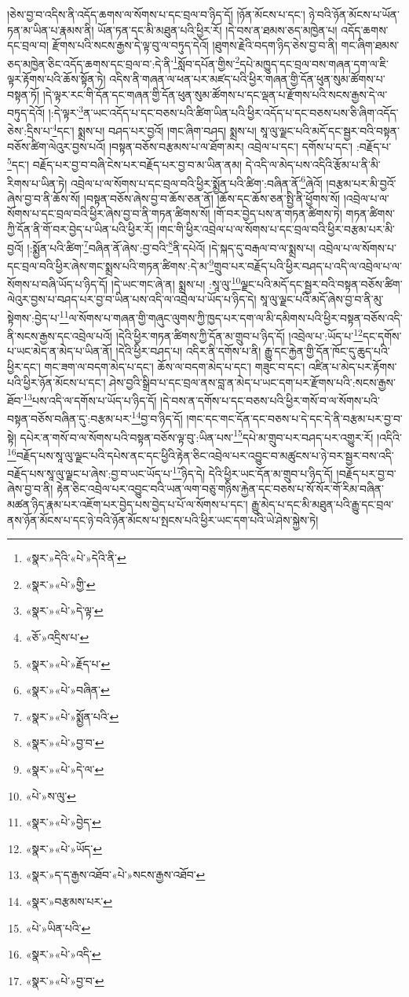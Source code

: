 །ཅེས་བྱ་བ་འདིས་ནི་འདོད་ཆགས་ལ་སོགས་པ་དང་བྲལ་བ་ཉིད་དོ། །ཉོན་མོངས་པ་དང་། ཉེ་བའི་ཉོན་མོངས་པ་ཡོན་ཏན་མ་ཡིན་པ་རྣམས་ནི། ཡོན་ཏན་དང་མི་མཐུན་པའི་ཕྱིར་རོ། །དེ་བས་ན་ཐམས་ཅད་མཁྱེན་པ། འདོད་ཆགས་དང་བྲལ་བ། རྫོགས་པའི་སངས་རྒྱས་དེ་ལྟ་བུ་ལ་བཏུད་དེའོ། །ཐུགས་རྗེའི་བདག་ཉིད་ཅེས་བྱ་བ་ནི། གང་ཞིག་ཐམས་ཅད་མཁྱེན་ཅིང་འདོད་ཆགས་དང་བྲལ་བ་:དེ་ནི་\footnote{«སྣར་»དེའི་«པེ་»དེའི་ནི་}སློབ་དཔོན་གྱིས་\footnote{«སྣར་»«པེ་»གྱི་}དཔེ་མཁྱུད་དང་བྲལ་བས་གཞན་དག་ལ་ཇི་ལྟར་རྟོགས་པའི་ཆོས་སྟོན་ཏེ། འདིས་ནི་གཞན་ལ་ཕན་པར་མཛད་པའི་ཕྱིར་གཞན་གྱི་དོན་ཕུན་སུམ་ཚོགས་པ་བསྟན་ཏོ། །དེ་ལྟར་རང་གི་དོན་དང་གཞན་གྱི་དོན་ཕུན་སུམ་ཚོགས་པ་དང་ལྡན་པ་རྫོགས་པའི་སངས་རྒྱས་དེ་ལ་བཏུད་དེའོ། །:དེ་ལྟར་\footnote{«སྣར་»«པེ་»དེ་ལྟ་}ན་ཡང་འདོད་པ་དང་བཅས་པའི་ཚིག་ཡིན་པའི་ཕྱིར་འདོད་པ་དང་བཅས་པས་ཅི་ཞིག་འདོད་ཅེས་:དྲིས་པ་\footnote{«ཅོ་»འདྲིས་པ་}དང་། སྨྲས་པ། བཤད་པར་བྱའོ། །གང་ཞིག་བཤད། སྨྲས་པ། སཱ་ལུ་ལྗང་པའི་མདོ་དང་སྦྱར་བའི་བསྟན་བཅོས་ཚིག་ལེའུར་བྱས་པའོ། །བསྟན་བཅོས་བརྩམས་པ་ལ་ཐོག་མར། འབྲེལ་པ་དང་། དགོས་པ་དང་། :བརྗོད་པ་\footnote{«སྣར་»«པེ་»རྗོད་པ་}དང་། བརྗོད་པར་བྱ་བ་བཞི་ངེས་པར་བརྗོད་པར་བྱ་བ་མ་ཡིན་ནམ། དེ་འདི་ལ་མེད་པས་འདིའི་རྩོམ་པ་ནི་མི་རིགས་པ་ཡིན་ཏེ། འབྲེལ་པ་ལ་སོགས་པ་དང་བྲལ་བའི་ཕྱིར་སྨྱོན་པའི་ཚིག་:བཞིན་ནོ་\footnote{«སྣར་»«པེ་»བཞིན་}ཞེའོ། །བརྩམ་པར་མི་བྱའོ་ཞེས་བྱ་བ་ནི་ཆོས་སོ། །བསྟན་བཅོས་ཞེས་བྱ་བ་ཆོས་ཅན་ནོ། །ཆོས་དང་ཆོས་ཅན་སྤྱི་ནི་ཕྱོགས་སོ། །འབྲེལ་པ་ལ་སོགས་པ་དང་བྲལ་བའི་ཕྱིར་ཞེས་བྱ་བ་ནི་གཏན་ཚིགས་སོ། །གོ་བར་བྱེད་པས་ན་གཏན་ཚིགས་ཏེ། གཏན་ཚིགས་ཀྱི་དོན་ནི་གོ་བར་བྱེད་པ་ཡིན་པའི་ཕྱིར་རོ། །གང་གི་ཕྱིར་འབྲེལ་པ་ལ་སོགས་པ་དང་བྲལ་བའི་ཕྱིར་བརྩམ་པར་མི་བྱའོ། །:སྨྱོན་པའི་ཚིག་\footnote{«སྣར་»«པེ་»སྨྱོན་པའི་}བཞིན་ནོ་ཞེས་:བྱ་བའི་\footnote{«སྣར་»«པེ་»བྱ་བ་}ནི་དཔེའོ། །དེ་སྐད་དུ་བརྒལ་བ་ལ་སྨྲས་པ། འབྲེལ་པ་ལ་སོགས་པ་དང་བྲལ་བའི་ཕྱིར་ཞེས་གང་སྨྲས་པའི་གཏན་ཚིགས་:དེ་མ་\footnote{«སྣར་»«པེ་»དེ་ལ་}གྲུབ་པར་བརྗོད་པའི་ཕྱིར་བཤད་པ་འདི་ལ་འབྲེལ་པ་ལ་སོགས་པ་བཞི་ཡོད་པ་ཉིད་དོ། །དེ་ཡང་གང་ཞེ་ན། སྨྲས་པ། :སཱ་ལུ་\footnote{«པེ་»ས་ལུ་}ལྗང་པའི་མདོ་དང་སྦྱར་བའི་བསྟན་བཅོས་ཚིག་ལེའུར་བྱས་པ་བཤད་པར་བྱ་བ་ཡིན་པས་འདི་ལ་འབྲེལ་པ་ཡོད་པ་ཉིད་དེ། སཱ་ལུ་ལྗང་པའི་མདོ་ཞེས་བྱ་བ་ནི་མུ་སྟེགས་:བྱེད་པ་\footnote{«སྣར་»«པེ་»བྱེད་}ལ་སོགས་པ་གཞན་གྱི་གཞུང་ལུགས་ཀྱི་ཁྱད་པར་དག་ལ་མི་དམིགས་པའི་ཕྱིར་བསྟན་བཅོས་འདི་ནི་སངས་རྒྱས་དང་འབྲེལ་པའོ། །དེའི་ཕྱིར་གཏན་ཚིགས་ཀྱི་དོན་མ་གྲུབ་པ་ཉིད་དོ། །འབྲེལ་པ་:ཡོད་པ་\footnote{«སྣར་»«པེ་»ཡོད་}དང་དགོས་པ་ཡང་མེད་ན་མེད་པ་ཡིན་ནོ། །དེའི་ཕྱིར་བཤད་པ། འདིར་ནི་དགོས་པ་ནི། རྒྱུ་དང་རྐྱེན་གྱི་དོན་ཁོང་དུ་ཆུད་པའི་ཕྱིར་དང་། གང་ཟག་ལ་བདག་མེད་པ་དང་། ཆོས་ལ་བདག་མེད་པ་དང་། གཟུང་བ་དང་། འཛིན་པ་མེད་པར་རྟོགས་པའི་ཕྱིར་ཉོན་མོངས་པ་དང་། ཤེས་བྱའི་སྒྲིབ་པ་དང་བྲལ་ནས་བླ་ན་མེད་པ་ཡང་དག་པར་རྫོགས་པའི་:སངས་རྒྱས་ཐོབ་\footnote{«སྣར་»ད་ད་རྒྱས་འཐོབ་«པེ་»སངས་རྒྱས་འཐོབ་}པས་འདི་ལ་དགོས་པ་ཡོད་པ་ཉིད་དོ། །དེ་བས་ན་དགོས་པ་དང་བཅས་པའི་ཕྱིར་གསོ་བ་ལ་སོགས་པའི་བསྟན་བཅོས་བཞིན་དུ་:བརྩམ་པར་\footnote{«སྣར་»བརྩམས་པར་}བྱ་བ་ཉིད་དོ། །གང་དང་གང་དོན་དང་བཅས་པ་དེ་དང་དེ་ནི་བརྩམ་པར་བྱ་བ་སྟེ། དཔེར་ན་གསོ་བ་ལ་སོགས་པའི་བསྟན་བཅོས་ལྟ་བུ་:ཡིན་པས་\footnote{«པེ་»ཡིན་པའི་}དཔེ་མ་གྲུབ་པར་བཤད་པར་འགྱུར་རོ། །འདིའི་\footnote{«སྣར་»«པེ་»འདི་}བརྗོད་པས་སཱ་ལུ་ལྗང་པའི་དཔེས་ནང་དང་ཕྱིའི་རྟེན་ཅིང་འབྲེལ་པར་འབྱུང་བ་མཚུངས་པ་ཉེ་བར་སྦྱར་བས་འདི་བརྗོད་པས་སཱ་ལུ་ལྗང་པ་ཞེས་:བྱ་བ་ཡང་ཡོད་པ་\footnote{«སྣར་»«པེ་»བྱ་བ་}ཉིད་དེ། དེའི་ཕྱིར་ཡང་དོན་མ་གྲུབ་པ་ཉིད་དོ། །བརྗོད་པར་བྱ་བ་ཞེས་བྱ་བ་ནི། རྟེན་ཅིང་འབྲེལ་པར་འབྱུང་བའི་ཡན་ལག་བཅུ་གཉིས་རྐྱེན་དང་བཅས་པ་སོ་སོར་གོ་རིམ་བཞིན་མཚན་ཉིད་རྣམ་པར་འཇོག་པར་བྱེད་པས་བྱེད་པ་པོ་ལ་སོགས་པ་དང་། རྒྱུ་མེད་པ་དང་མི་མཐུན་པའི་རྒྱུ་དང་བྲལ་ནས་ཉོན་མོངས་པ་དང་ཉེ་བའི་ཉོན་མོངས་པ་སྤངས་པའི་ཕྱིར་ཡང་དག་པའི་ཡེ་ཤེས་སྐྱེས་ཏེ། 